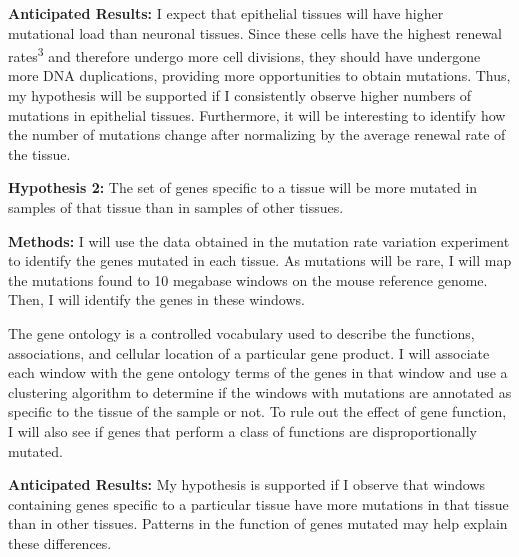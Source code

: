 \documentclass[12pt]{article}
\begin{document}
\textbf{Anticipated Results:}
I expect that epithelial tissues will have higher mutational load than neuronal tissues. Since these cells have the highest renewal rates\textsuperscript{3} and therefore undergo more cell divisions, they should have undergone more DNA duplications, providing more opportunities to obtain mutations.
Thus, my hypothesis will be supported if I consistently observe higher numbers of mutations in epithelial tissues. Furthermore, it will be interesting to identify how the number of mutations change after normalizing by the average renewal rate of the tissue.  


\textbf{Hypothesis 2:}
The set of genes specific to a tissue will be more mutated in samples of that tissue than in samples of other tissues.

\textbf{Methods:}
I will use the data obtained in the mutation rate variation experiment to identify the genes mutated in each tissue. As mutations will be rare, I will map the mutations found to 10 megabase windows on the mouse reference genome. Then, I will identify the genes in these windows.

The gene ontology is a controlled vocabulary used to describe the functions, associations, and cellular location of a particular gene product. I will associate each window with the gene ontology terms of the genes in that window and use a clustering algorithm to determine if the windows with mutations are annotated as specific to the tissue of the sample or not.%
To rule out the effect of gene function, I will also see if genes that perform a class of functions are disproportionally mutated.


\textbf{Anticipated Results:}
My hypothesis is supported if I observe that windows containing genes specific to a particular tissue have more mutations in that tissue than in other tissues. Patterns in the function of genes mutated may help explain these differences.
\end{document}
